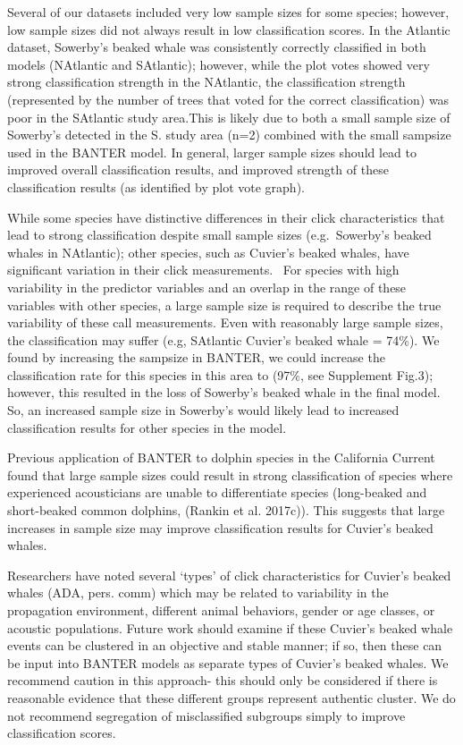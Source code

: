 \documentclass[
  letterpaper,
  DIV=11,
  numbers=noendperiod]{scrartcl}
\begin{document}
Several of our datasets included very low sample sizes for some species;
however, low sample sizes did not always result in low classification
scores. In the Atlantic dataset, Sowerby's beaked whale was consistently
correctly classified in both models (NAtlantic and SAtlantic); however,
while the plot votes showed very strong classification strength in the
NAtlantic, the classification strength (represented by the number of
trees that voted for the correct classification) was poor in the
SAtlantic study area.This is likely due to both a small sample size of
Sowerby's detected in the S. study area (n=2) combined with the small
sampsize used in the BANTER model. In general, larger sample sizes
should lead to improved overall classification results, and improved
strength of these classification results (as identified by plot vote
graph).

While some species have distinctive differences in their click
characteristics that lead to strong classification despite small sample
sizes (e.g.~Sowerby's beaked whales in NAtlantic); other species, such
as Cuvier's beaked whales, have significant variation in their click
measurements. ~For species with high variability in the predictor
variables and an overlap in the range of these variables with other
species, a large sample size is required to describe the true
variability of these call measurements. Even with reasonably large
sample sizes, the classification may suffer (e.g, SAtlantic Cuvier's
beaked whale = 74\%). We found by increasing the sampsize in BANTER, we
could increase the classification rate for this species in this area to
(97\%, see Supplement Fig.3); however, this resulted in the loss of
Sowerby's beaked whale in the final model. So, an increased sample size
in Sowerby's would likely lead to increased classification results for
other species in the model.

Previous application of BANTER to dolphin species in the California
Current found that large sample sizes could result in strong
classification of species where experienced acousticians are unable to
differentiate species (long-beaked and short-beaked common dolphins,
(Rankin et al. 2017c)). This suggests that large increases in sample
size may improve classification results for Cuvier's beaked whales.

Researchers have noted several `types' of click characteristics for
Cuvier's beaked whales (ADA, pers. comm) which may be related to
variability in the propagation environment, different animal behaviors,
gender or age classes, or acoustic populations. Future work should
examine if these Cuvier's beaked whale events can be clustered in an
objective and stable manner; if so, then these can be input into BANTER
models as separate types of Cuvier's beaked whales. We recommend caution
in this approach- this should only be considered if there is reasonable
evidence that these different groups represent authentic cluster. We do
not recommend segregation of misclassified subgroups simply to improve
classification scores.
\end{document}
